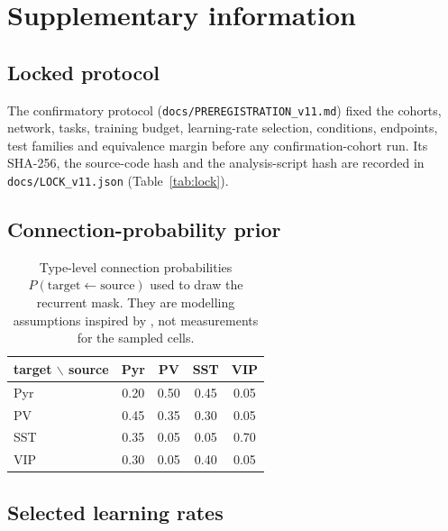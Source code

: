 \section{Supplementary information}

\subsection{Locked protocol}\label{sec:protocol}
The confirmatory protocol (\texttt{docs/PREREGISTRATION\_v11.md}) fixed the cohorts, network,
tasks, training budget, learning-rate selection, conditions, endpoints, test families and
equivalence margin before any confirmation-cohort run. Its SHA-256, the source-code hash and the
analysis-script hash are recorded in \texttt{docs/LOCK\_v11.json} (Table~\ref{tab:lock}).



\subsection{Connection-probability prior}
\begin{table}[h]\centering\small
\caption{Type-level connection probabilities $P(\text{target}\leftarrow\text{source})$ used to
draw the recurrent mask. They are modelling assumptions inspired by
\citet{pfeffer2013,pi2013}, not measurements for the sampled cells.}\label{tab:priors}
\begin{tabular}{lcccc}\toprule
target $\backslash$ source & Pyr & PV & SST & VIP\\ \midrule
Pyr & 0.20 & 0.50 & 0.45 & 0.05\\
PV  & 0.45 & 0.35 & 0.30 & 0.05\\
SST & 0.35 & 0.05 & 0.05 & 0.70\\
VIP & 0.30 & 0.05 & 0.40 & 0.05\\ \bottomrule
\end{tabular}\end{table}

\subsection{Selected learning rates}


